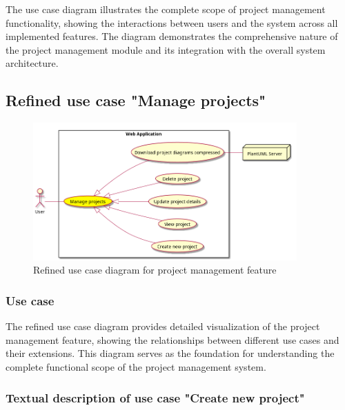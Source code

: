 The use case diagram illustrates the complete scope of project management functionality, showing the interactions between users and the system across all implemented features. The diagram demonstrates the comprehensive nature of the project management module and its integration with the overall system architecture.

\subsection{Refined use case "Manage projects"}

\begin{figure}[H]
\centering
\includegraphics[width=0.9\textwidth]{conception/SprintIII/use_case_diagrams/refined_use_case_feature_project_management.png}
\caption{Refined use case diagram for project management feature}
\label{fig:refined_use_case_project_mgmt}
\end{figure}

\subsubsection{Use case}

The refined use case diagram provides detailed visualization of the project management feature, showing the relationships between different use cases and their extensions. This diagram serves as the foundation for understanding the complete functional scope of the project management system.

\subsubsection{Textual description of use case "Create new project"}

